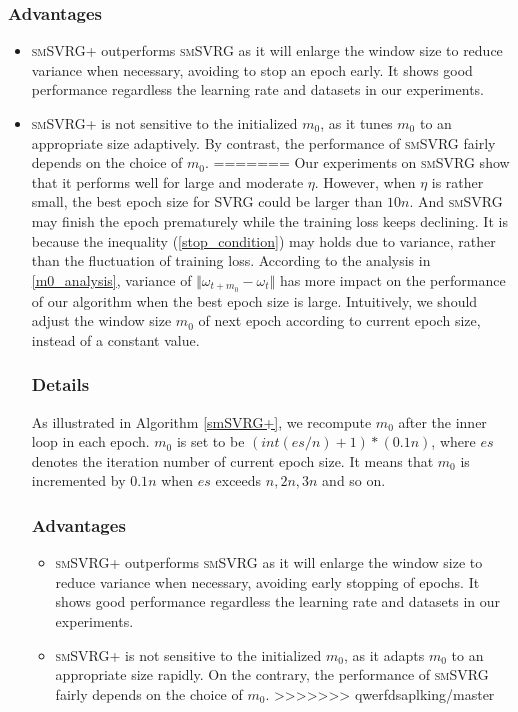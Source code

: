 \documentclass[conference]{IEEEtran}
\begin{document}
 \subsubsection{Advantages}
 \begin{itemize}
 \item \textsc{smSVRG+} outperforms \textsc{smSVRG} as it will enlarge the window size to reduce variance when necessary, avoiding to stop an epoch early. It shows good performance regardless the learning rate and datasets in  our experiments. 
 \item \textsc{smSVRG+} is not sensitive to the initialized $m_0$, as it tunes $m_0$ to an appropriate size adaptively. By contrast, the performance of \textsc{smSVRG} fairly depends on the choice of $m_0$.
=======
 Our experiments on \textsc{smSVRG} show that it performs well for large and moderate $\eta$. However, when $\eta$ is rather small, the best epoch size for SVRG could be larger than $10n$. And \textsc{smSVRG} may finish the epoch prematurely while the training loss keeps declining. It is because the inequality (\ref{stop_condition}) may holds due to variance, rather than the fluctuation of training loss. According to the analysis in \ref{m0_analysis}, variance of $\Vert\omega_{t+m_0}-\omega_t\Vert$ has more impact on the performance of our algorithm when the best epoch size is large. Intuitively, we should adjust the window size $m_0$ of next epoch according to current epoch size, instead of a constant value.
 \subsubsection{Details}
 As illustrated in Algorithm \ref{smSVRG+}, we recompute $m_0$ after the inner loop in each epoch. $m_0$ is set to be $(int(es/n)+1) * (0.1n)$, where $es$ denotes the iteration number of current epoch size. It means that $m_0$ is incremented by $0.1n$ when $es$ exceeds $n,2n,3n$ and so on.
 \subsubsection{Advantages}
 \begin{itemize}
 \item \textsc{smSVRG+} outperforms \textsc{smSVRG} as it will enlarge the window size to reduce variance when necessary, avoiding early stopping of epochs. It shows good performance regardless the learning rate and datasets in  our experiments.  
 \item \textsc{smSVRG+} is not sensitive to the initialized $m_0$, as it adapts $m_0$ to an appropriate size rapidly. On the contrary, the performance of \textsc{smSVRG} fairly depends on the choice of $m_0$.
>>>>>>> qwerfdsaplking/master
 \end{itemize}
 

\end{itemize}
\end{document}
